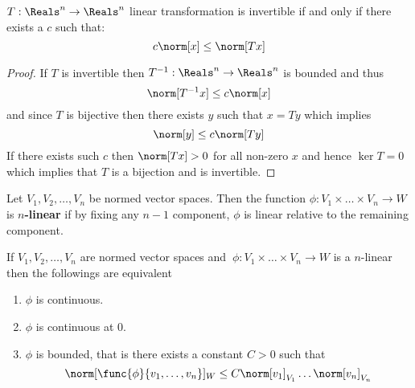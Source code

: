 \begin{theorem}
    \(T : \Reals^n \to \Reals^n\) linear transformation is invertible if and only if there exists a \(c\) such that:
    \begin{equation*}
        c \norm[x] \leq \norm[Tx]
    \end{equation*}
\end{theorem}

\begin{proof}
    If \(T\) is invertible then \(T^{-1} : \Reals^n \to \Reals^n \) is bounded and thus
    \begin{equation*}
        \norm[T^{-1}x] \leq c \norm[x]
    \end{equation*}
    and since \(T\) is bijective then there exists \(y\) such that \(x = Ty\) which implies
    \begin{equation*}
        \norm[y] \leq c\norm[Ty]
    \end{equation*}
    If there exists such \(c\) then \(\norm[Tx] > 0\) for all non-zero \(x\) and hence \(\ker T  = 0\) which implies that \(T\) is a bijection and is invertible.
\end{proof}

\begin{definition}
    Let \(V_1, V_2 ,\dots , V_n\) be  normed vector spaces. Then the function \(\phi : V_1 \times \dots \times V_n \to W\) is \textbf{\(n\)-linear} if by fixing any \(n-1\) component, \(\phi\) is linear relative to the remaining component.
\end{definition}

\begin{proposition}
    If \(V_1, V_2, \dots , V_n\) are  normed vector spaces and \(\ \phi : V_1 \times \dots \times V_n \to W \) is a \(n\)-linear then the followings are equivalent
    \begin{enumerate}
        \item \(\phi\) is continuous. \label{it:continuityOfnLinear}
        \item \(\phi\) is continuous at 0. \label{it:continuityOfnLinearataPoint}
        \item \(\phi\) is bounded, that is there exists a constant \(C > 0\) such that \label{it:boundednessOfnLinear}
              \begin{equation*}
                  \norm[\func{\phi}{v_1, \dots ,v_n}]_W \leq C \norm[v_1]_{V_1} \dots \norm[v_n]_{V_n}
              \end{equation*}
    \end{enumerate}
\end{proposition}

